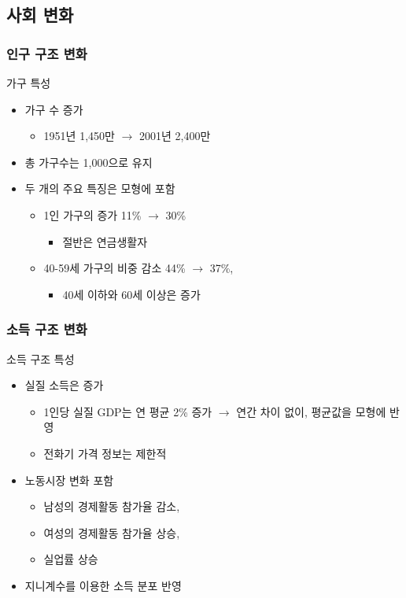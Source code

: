 \documentclass[hyperref={unicode}]{beamer}
\begin{document}
\subsection*{사회 변화}
\subsubsection*{인구 구조 변화}
\begin{frame}{가구 특성}
\begin{itemize}
\item 가구 수 증가
	\begin{itemize}
	\item 1951년 1,450만 $\rightarrow$ 2001년 2,400만
	\end{itemize}
\item 총 가구수는 1,000으로 유지
\item 두 개의 주요 특징은 모형에 포함
	\begin{itemize}
	\item 1인 가구의 증가 11\% $\rightarrow$ 30\%
		\begin{itemize}
		\item 절반은 연금생활자
		\end{itemize}
	\item 40-59세 가구의 비중 감소 44\% $\rightarrow$ 37\%, 
		\begin{itemize}
		\item 40세 이하와 60세 이상은 증가
		\end{itemize}
	\end{itemize}
\end{itemize}	
\end{frame}

\subsubsection*{소득 구조 변화}
\begin{frame}{소득 구조 특성}
\begin{itemize}
\item 실질 소득은 증가
	\begin{itemize}
	\item 1인당 실질 GDP는 연 평균 2\% 증가 $\rightarrow$ 연간 차이 없이, 평균값을 모형에 반영
	\item 전화기 가격 정보는 제한적
	\end{itemize}
\item 노동시장 변화 포함
	\begin{itemize}
	\item 남성의 경제활동 참가율 감소,
	\item 여성의 경제활동 참가율 상승, 
	\item 실업률 상승
	\end{itemize}
\item 지니계수를 이용한 소득 분포 반영
\end{itemize}	
\end{frame}
\end{document}
